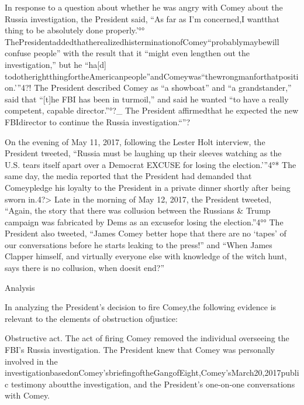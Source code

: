 {In response to a question about whether he was angry with Comey about the Russia investigation, the President said, “As far as I’m concerned,I wantthat thing to be absolutely done properly.’°°
ThePresidentaddedthatherealizedhisterminationofComey“probablymaybewill confuse people” with the result that it “might even lengthen out the investigation,” but he “ha[d] todotherightthingfortheAmericanpeople”andComeywas“thewrongmanforthatposition.’”4?!
The President described Comey as “a showboat” and “a grandstander,” said that “[t]he FBI has been in turmoil,” and said he wanted “to have a really competent, capable director.”°?_
The President affirmedthat he expected the new FBIdirector to continue the Russia investigation.“”?

On the evening of May 11, 2017, following the Lester Holt interview, the President tweeted, “Russia must be laughing up their sleeves watching as the U.S. tears itself apart over a Democrat EXCUSE for losing the election.’”4°*
The same day, the media reported that the President had demanded that Comeypledge his loyalty to the President in a private dinner shortly after being sworn in.4?>
Late in the morning of May 12, 2017, the President tweeted, “Again, the story that there was collusion between the Russians & Trump campaign was fabricated by Dems as an excusefor losing the election.”4°°
The President also tweeted, “James Comey better hope that there are no ‘tapes’ of our conversations before he starts leaking to the press!” and “When James Clapper himself, and virtually everyone else with knowledge of the witch hunt, says there is no collusion, when doesit end?”

Analysis

In analyzing the President’s decision to fire Comey,the following evidence is relevant to the elements of obstruction ofjustice:

Obstructive act.
The act of firing Comey removed the individual overseeing the FBI’s Russia investigation.
The President knew that Comey was personally involved in the investigationbasedonComey’sbriefingoftheGangofEight,Comey’sMarch20,2017public testimony aboutthe investigation, and the President’s one-on-one conversations with Comey.

}
